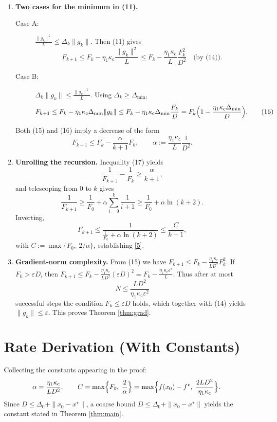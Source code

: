 \documentclass{article}
\begin{document}
\begin{enumerate}
\item[Step 7.] \textbf{Two cases for the minimum in (11).}
\begin{description}
\item[Case A:] $\frac{\|g_k\|^{2}}{L}\le \Delta_k\|g_k\|$.  
Then (11) gives
\[
F_{k+1}\le F_k-\eta_1\kappa_{\mathrm{c}}\frac{\|g_k\|^{2}}{L}
        \le F_k-\frac{\eta_1\kappa_{\mathrm{c}}}{L}\frac{F_k^{2}}{D^{2}}
        \quad\text{(by (14))}.
\tag{15}
\]
\item[Case B:] $\Delta_k\|g_k\|\le \frac{\|g_k\|^{2}}{L}$.  
Using $\Delta_k\ge\Delta_{\min}$,
\[
F_{k+1}\le F_k-\eta_1\kappa_{\mathrm{c}}\Delta_{\min}\|g_k\|
        \le F_k-\eta_1\kappa_{\mathrm{c}}\Delta_{\min}\frac{F_k}{D}
        =F_k\Bigl(1-\frac{\eta_1\kappa_{\mathrm{c}}\Delta_{\min}}{D}\Bigr).
\tag{16}
\]
\end{description}
Both (15) and (16) imply a decrease of the form
\[
F_{k+1}\le F_k-\frac{\alpha}{k+1}F_k,
\qquad\alpha:=\frac{\eta_1\kappa_{\mathrm{c}}}{L}\frac{1}{D^{2}}.
\tag{17}
\]

\item[Step 8.] \textbf{Unrolling the recursion.}  
Inequality (17) yields
\[
\frac{1}{F_{k+1}}-\frac{1}{F_k}
   \ge \frac{\alpha}{k+1},
\]
and telescoping from $0$ to $k$ gives
\[
\frac{1}{F_{k+1}} \ge \frac{1}{F_0}+\alpha\sum_{i=0}^{k}\frac{1}{i+1}
               \ge \frac{1}{F_0}+\alpha\ln(k+2).
\]
Inverting,
\[
F_{k+1}\le \frac{1}{\frac{1}{F_0}+\alpha\ln(k+2)}
        \le \frac{C}{k+1},
\]
with $C:=\max\{F_0,\;2/\alpha\}$, establishing \eqref{5}.

\item[Step 9.] \textbf{Gradient‑norm complexity.}  
From (15) we have $F_{k+1}\le F_k-\frac{\eta_1\kappa_{\mathrm{c}}}{L D^{2}}F_k^{2}$.  
If $F_k>\varepsilon D$, then $F_{k+1}\le F_k-\frac{\eta_1\kappa_{\mathrm{c}}}{L D^{2}}(\varepsilon D)^{2}
 =F_k-\frac{\eta_1\kappa_{\mathrm{c}}\varepsilon^{2}}{L}$.  
Thus after at most
\[
N\le \frac{L D^{2}}{\eta_1\kappa_{\mathrm{c}}\varepsilon^{2}}
\]
successful steps the condition $F_k\le\varepsilon D$ holds, which together with (14) yields $\|g_k\|\le\varepsilon$. This proves Theorem \ref{thm:grad}.
\end{enumerate}

\section*{Rate Derivation (With Constants)}
Collecting the constants appearing in the proof:
\[
\alpha = \frac{\eta_1\kappa_{\mathrm{c}}}{L D^{2}},\qquad
C = \max\Bigl\{F_0,\;\frac{2}{\alpha}\Bigr\}
   =\max\Bigl\{f(x_0)-f^\star,\;
      \frac{2L D^{2}}{\eta_1\kappa_{\mathrm{c}}}\Bigr\}.
\]
Since $D\le \Delta_0+ \|x_0-x^\star\|$, a coarse bound $D\le \Delta_0+\|x_0-x^\star\|$ yields the constant stated in Theorem \ref{thm:main}.
\end{document}
